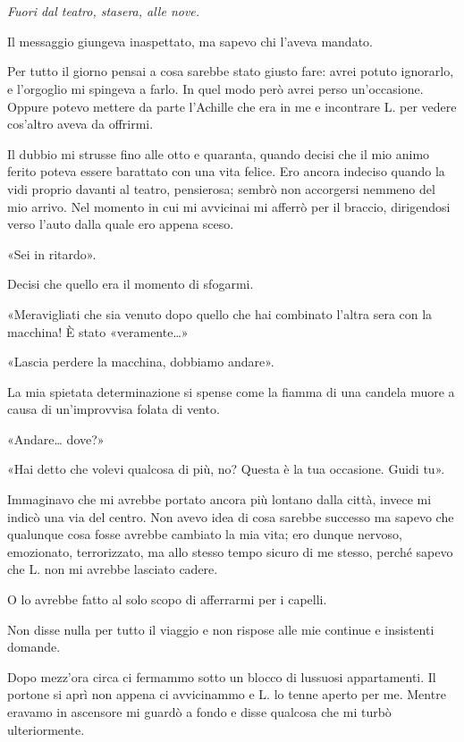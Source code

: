 \chapter{}
\label{ch:2}

\emph{Fuori dal teatro, stasera, alle nove.}

Il messaggio giungeva inaspettato, ma sapevo chi l'aveva mandato.

Per tutto il giorno pensai a cosa sarebbe stato giusto fare: avrei potuto ignorarlo, e l'orgoglio mi
spingeva a farlo. In quel modo però avrei perso un'occasione. Oppure potevo mettere da parte
l'Achille che era in me e incontrare L. per vedere cos'altro aveva da offrirmi.

Il dubbio mi strusse fino alle otto e quaranta, quando decisi che il mio animo ferito poteva essere
barattato con una vita felice. Ero ancora indeciso quando la vidi proprio davanti al teatro,
pensierosa; sembrò non accorgersi nemmeno del mio arrivo. Nel momento in cui mi avvicinai mi afferrò
per il braccio, dirigendosi verso l'auto dalla quale ero appena sceso.

«Sei in ritardo».

Decisi che quello era il momento di sfogarmi.

«Meravigliati che sia venuto dopo quello che hai combinato l'altra sera con la macchina! È stato
«veramente\dots{}»

«Lascia perdere la macchina, dobbiamo andare».

La mia spietata determinazione si spense come la fiamma di una candela muore a causa di
un'improvvisa folata di vento.

«Andare\dots{} dove?»

«Hai detto che volevi qualcosa di più, no? Questa è la tua occasione. Guidi tu».

Immaginavo che mi avrebbe portato ancora più lontano dalla città, invece mi indicò una via del
centro. Non avevo idea di cosa sarebbe successo ma sapevo che qualunque cosa fosse avrebbe cambiato
la mia vita; ero dunque nervoso, emozionato, terrorizzato, ma allo stesso tempo sicuro di me stesso,
perché sapevo che L. non mi avrebbe lasciato cadere.

O lo avrebbe fatto al solo scopo di afferrarmi per i capelli.

Non disse nulla per tutto il viaggio e non rispose alle mie continue e insistenti domande.

Dopo mezz'ora circa ci fermammo sotto un blocco di lussuosi appartamenti. Il portone si aprì non
appena ci avvicinammo e L. lo tenne aperto per me. Mentre eravamo in ascensore mi guardò a fondo e
disse qualcosa che mi turbò ulteriormente.

